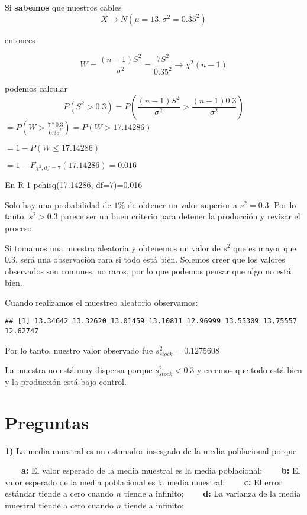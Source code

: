 \documentclass[
]{book}
\begin{document}
Si \textbf{sabemos} que nuestros cables
\[X \rightarrow N(\mu=13, \sigma^2=0.35^2)\]

entonces

\[W=\frac{(n-1)S^2}{\sigma^2}= \frac{7S^2}{0.35^2} \rightarrow \chi^2(n-1)\]

podemos calcular \[P(S^2 > 0.3)=P(\frac{(n-1)S^2}{\sigma^2} > \frac{(n-1)0.3}{\sigma^2 })\]
\(=P(W > \frac{7*0.3}{0.35^2})=P(W > 17.14286)\)

\(=1-P(W \leq 17.14286)\)

\(= 1- F_{\chi^2,df=7}(17.14286)=0.016\)

En R
1-pchisq(17.14286, df=7)=0.016

Solo hay una probabilidad de \(1\%\) de obtener un valor superior a \(s^2=0.3\). Por lo tanto, \(s^2>0.3\) parece ser un buen criterio para detener la producción y revisar el proceso.

Si tomamos una muestra aleatoria y obtenemos un valor de \(s ^2\) que es mayor que \(0.3\), será una observación rara si todo está bien. Solemos creer que los valores observados son comunes, no raros, por lo que podemos pensar que algo no está bien.

Cuando realizamos el muestreo aleatorio observamos:

\begin{verbatim}
## [1] 13.34642 13.32620 13.01459 13.10811 12.96999 13.55309 13.75557 12.62747
\end{verbatim}

Por lo tanto, nuestro valor observado fue \(s^2_{stock}=0.1275608\)

La muestra no está muy dispersa porque \(s^2_{stock} < 0.3\) y creemos que todo está bien y la producción está bajo control.

\hypertarget{preguntas-7}{%
\section{Preguntas}\label{preguntas-7}}

\textbf{1)} La media muestral es un estimador insesgado de la media poblacional porque

\textbf{\(\qquad\)a:} El valor esperado de la media muestral es la media poblacional;
\textbf{\(\qquad\)b:} El valor esperado de la media poblacional es la media muestral;
\textbf{\(\qquad\)c:} El error estándar tiende a cero cuando \(n\) tiende a infinito;
\textbf{\(\qquad\)d:} La varianza de la media muestral tiende a cero cuando \(n\) tiende a infinito;
\end{document}
